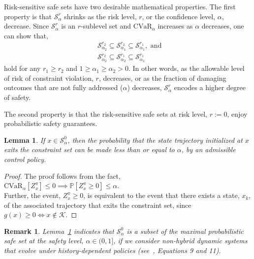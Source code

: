 \documentclass[letterpaper, 10 pt, conference]{ieeeconf}  %
\newtheorem{lemma}{Lemma}
\newtheorem{remark}{Remark}
\begin{document}
Risk-sensitive safe sets have two desirable mathematical properties.
The first property is that $\mathcal{S}_\alpha^r$ shrinks as the risk level, $r$, or the confidence level, $\alpha$, decrease.
Since $\mathcal{S}_\alpha^r$ is an $r$-sublevel set and $\text{CVaR}_\alpha$ increases as $\alpha$ decreases,
one can show that,
\begin{equation}\begin{aligned}
& \mathcal{S}_{\alpha_2}^{r_2} \subseteq \mathcal{S}_{\alpha_1}^{r_2} \subseteq \mathcal{S}_{\alpha_1}^{r_1}, \text{ and } \\
& \mathcal{S}_{\alpha_2}^{r_2} \subseteq \mathcal{S}_{\alpha_2}^{r_1} \subseteq \mathcal{S}_{\alpha_1}^{r_1}
\end{aligned}\end{equation}
hold for any $r_1 \geq r_2$ and $1 \geq \alpha_1 \geq \alpha_2 > 0$.
In other words, as the allowable level of risk of constraint violation, $r$, decreases, or as the fraction of damaging outcomes that are not fully addressed ($\alpha$) decreases,
$\mathcal{S}_\alpha^r$ encodes a higher degree of safety.

The second property is that the risk-sensitive safe sets at risk level, $r := 0$, enjoy probabilistic safety guarantees.
\begin{lemma}\label{mylemma1}
If $x \in \mathcal{S}_\alpha^0$, then the probability that the state trajectory initialized at $x$ exits the constraint set can be made
less than or equal to $\alpha$, by an admissible control policy.
\end{lemma}
\begin{proof}
The proof follows from the fact,\footnotemark \\
$\text{CVaR}_\alpha[Z_x^\pi] \leq 0 \implies \mathbb{P}[Z_x^\pi\geq 0] \leq \alpha$. \\
Further, the event, $Z_x^\pi\geq 0$, is equivalent to the event that there exists a state, $x_k$, of the associated trajectory 
that exits the constraint set, since $g(x) \geq 0 \iff x \notin \mathcal{K}$.\footnotemark
{}
\end{proof}
\begin{remark}{}
Lemma~\ref{mylemma1} indicates that $\mathcal{S}_\alpha^0$ is a subset of the \textit{maximal probabilistic safe set} at the safety level, $\alpha \in (0, 1]$, if we consider non-hybrid dynamic systems that evolve under history-dependent policies (see~\cite{abate2008probabilistic}, Equations 9 and 11).
\end{remark}
\end{document}
